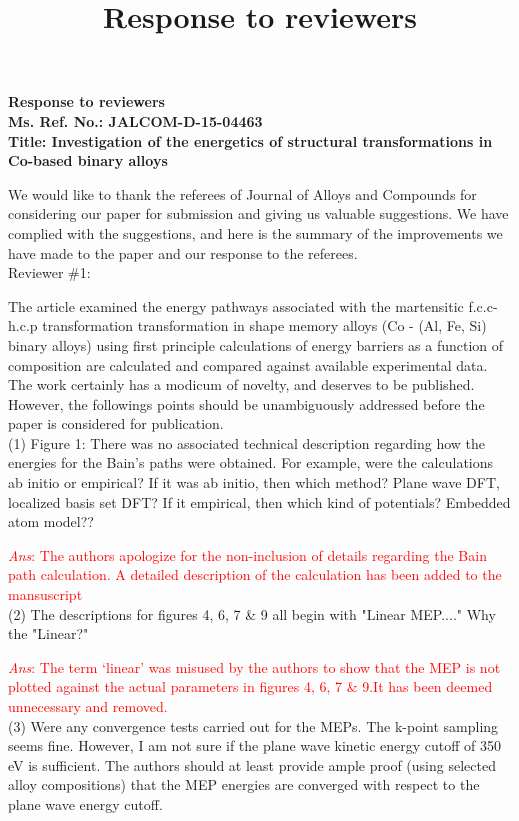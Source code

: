 \documentclass[letterpaper,10pt, notitlepage, leqno]{article}
\title{Response to reviewers}
\begin{document}
\begin{center}
\textbf{Response to reviewers \\ Ms. Ref. No.:  JALCOM-D-15-04463 \\ Title: Investigation of the energetics of structural transformations in Co-based binary alloys}
\end{center}
\onehalfspacing
We would like to thank the referees of Journal of Alloys and Compounds for considering our paper for submission and giving us valuable suggestions. We have complied with the suggestions, and here is the summary of the improvements we have made to the paper and our response to the referees. \\

\noindent Reviewer \#1: 

The article examined the energy pathways associated with the martensitic f.c.c-h.c.p transformation transformation in shape memory alloys (Co - (Al, Fe, Si) binary alloys) using first principle calculations of energy barriers as a function of composition are calculated and compared against available experimental data. The work certainly has a modicum of novelty, and deserves to be published. However, the followings points should be unambiguously addressed before the paper is considered for publication. \\

(1) Figure 1: There was no associated technical description regarding how the energies for the Bain's paths were obtained. For example, were the calculations ab initio or empirical? If it was ab initio, then which method? Plane wave DFT, localized basis set DFT? If it empirical, then which kind of potentials? Embedded atom model??

\textcolor{red}{\textit{Ans}: The authors apologize for the non-inclusion of details regarding the Bain path calculation. A detailed description of the calculation has been added to the mansuscript} \\

(2) The descriptions for figures 4, 6, 7 \& 9 all begin with "Linear MEP...." Why the "Linear?"

\textcolor{red}{\textit{Ans}: The term `linear' was misused by the authors to show that the MEP is not plotted against the actual parameters in figures 4, 6, 7 \& 9.It has been deemed unnecessary and removed.} \\


(3) Were any convergence tests carried out for the MEPs. The k-point sampling seems fine. However, I am not sure if the plane wave kinetic energy cutoff of 350 eV is sufficient. The authors should at least provide ample proof (using selected alloy compositions) that the MEP energies are converged with respect to the plane wave energy cutoff. \\
\end{document}
